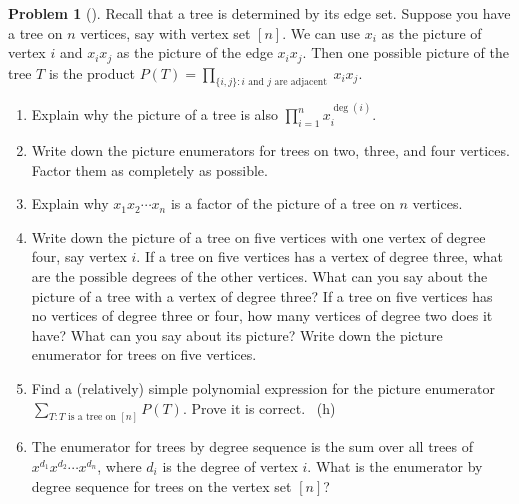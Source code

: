 \documentclass[10pt,]{book}
\theoremstyle{plain}
\theoremstyle{definition}
\newtheorem{activity}[project]{Problem}
\theoremstyle{definition}
\numberwithin{equation}{chapter}
\newcommand{\importantarrow}{\Rightarrow}
\begin{document}
\begin{activity}[]\marginsymbol[-1em]{\pdftooltip{$\importantarrow$}{especially interesting}} \label{activity-199}
\hypertarget{p-1123}{}%
Recall that a tree is determined by its edge set. Suppose you have a tree on \(n\) vertices, say with vertex set \([n]\). We can use \(x_i\) as the picture of vertex \(i\) and \(x_ix_j\) as the picture of the edge \(x_ix_j\). Then one possible picture of the tree \(T\) is the product \(P(T) = \prod_{\{i,j\}:i\text{ and }j\text{ are adjacent }}x_ix_j\).%
\begin{enumerate}[font=\bfseries,label=(\alph*),ref=\alph*]
\item\label{task-133} \marginsymbol[-2.5em]{} \hypertarget{p-1124}{}%
Explain why the picture of a tree is also \(\prod_{i=1}^nx_i^{\deg(i)}\).%
\item\label{task-134} \marginsymbol[-2.5em]{} \hypertarget{p-1126}{}%
Write down the picture enumerators for trees on two, three, and four vertices. Factor them as completely as possible.%
\item\label{task-135} \marginsymbol[-2.5em]{} \hypertarget{p-1128}{}%
Explain why \(x_1x_2\cdots x_n\) is a factor of the picture of a tree on \(n\) vertices.%
\item\label{task-136} \marginsymbol[-2.5em]{} \hypertarget{p-1130}{}%
Write down the picture of a tree on five vertices with one vertex of degree four, say vertex \(i\). If a tree on five vertices has a vertex of degree three, what are the possible degrees of the other vertices. What can you say about the picture of a tree with a vertex of degree three? If a tree on five vertices has no vertices of degree three or four, how many vertices of degree two does it have? What can you say about its picture? Write down the picture enumerator for trees on five vertices.%
\item\label{task-137} \marginsymbol[-2.5em]{} \hypertarget{p-1132}{}%
Find a (relatively) simple polynomial expression for the picture enumerator  \(\sum_{T \colon T\text{ is a tree on }[n]} P (T)\). Prove it is correct.%
~{\tiny (h)}\item\label{task-138} \marginsymbol[-2.5em]{} \hypertarget{p-1136}{}%
The enumerator for trees by degree sequence is the sum over all trees of \(x^{d_1}x^{d_2} \cdots x^{d_n}\), where \(d_i\) is the degree of vertex \(i\). What is the enumerator by degree sequence for trees on the vertex set \([n]\)?%
\end{enumerate}
\end{activity}
\typeout{************************************************}
\typeout{************************************************}
\end{document}
